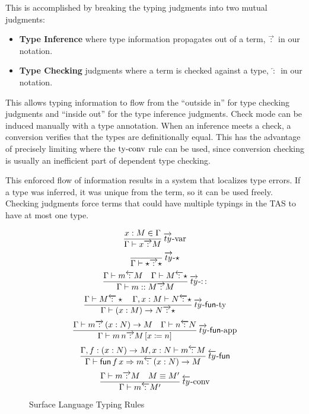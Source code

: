  
This is accomplished by breaking the typing judgments into two mutual judgments:
\begin{itemize}
\item \textbf{Type Inference} where type information propagates out of a term, $\overrightarrow{\,:\,}$ in our notation.
\item \textbf{Type Checking} judgments where a term is checked against a type, $\overleftarrow{\,:\,}$ in our notation.
\end{itemize}
This allows typing information to flow from the ``outside in'' for type checking judgments and ``inside out'' for the type inference judgments.
Check mode can be induced manually with a type annotation.
When an inference meets a check, a conversion verifies that the types are definitionally equal.
This has the advantage of precisely limiting where the $\operatorname{ty-conv}$ rule can be used, since conversion checking is usually an inefficient part of dependent type checking.
 
This enforced flow of information results in a system that localizes type errors.
If a type was inferred, it was unique from the term, so it can be used freely.
Checking judgments force terms that could have multiple typings in the \ac{TAS} to have at most one type.
 
\begin{figure}
\[
\frac{x:M\in\Gamma}{\Gamma\vdash x\overrightarrow{\,:\,}M}
\operatorname{\overrightarrow{ty}-var}
\]
\[
\frac{\,}{\Gamma\vdash\star\overrightarrow{\,:\,}\star}
\operatorname{\overrightarrow{ty}-\star}
\]
\[
\frac{\Gamma\vdash m\overleftarrow{\,:\,}M\quad\Gamma\vdash M\overleftarrow{\,:\,}\star}{\Gamma\vdash m::M\overrightarrow{\,:\,}M}
\operatorname{\overrightarrow{ty}-::}
\]
\[
\frac{\Gamma\vdash M\overleftarrow{\,:\,}\star\quad\Gamma,x:M\vdash N\overleftarrow{\,:\,}\star}{\Gamma\vdash\left(x:M\right)\rightarrow N\overrightarrow{\,:\,}\star}
\operatorname{\overrightarrow{ty}-\mathsf{fun}-ty}
\]
\[
\frac{\Gamma\vdash m\overrightarrow{\,:\,}\left(x:N\right)\rightarrow M\quad\Gamma\vdash n\overleftarrow{\,:\,}N}{\Gamma\vdash m\,n\overrightarrow{\,:\,}M\left[x\coloneqq n\right]}
\operatorname{\overrightarrow{ty}-\mathsf{fun}-app}
\]
\[
\frac{\Gamma,f:\left(x:N\right)\rightarrow M,x:N\vdash m\overleftarrow{\,:\,}M}{\Gamma\vdash\mathsf{fun}\,f\,x\Rightarrow m\overleftarrow{\,:\,}\left(x:N\right)\rightarrow M}
\operatorname{\overleftarrow{ty}-\mathsf{fun}}
\]
\[
\frac{\Gamma\vdash m\overrightarrow{\,:\,}M\quad M\equiv M'}{\Gamma\vdash m\overleftarrow{\,:\,}M'}
\operatorname{\overleftarrow{ty}-conv}
\]
 
\caption{Surface Language \Bidir{} Typing Rules}
\label{fig:surface-bityping-rules}
\end{figure}
 
